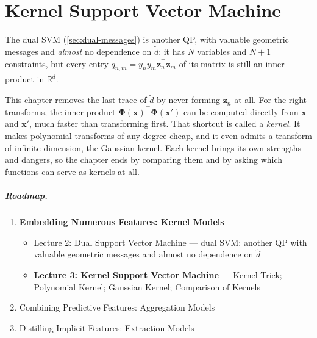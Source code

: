 \chapter{Kernel Support Vector Machine}

\begin{prev}
    The dual SVM (\autoref{sec:dual-messages}) is another QP, with valuable
    geometric messages and \emph{almost} no dependence on \(\tilde{d}\): it
    has \(N\) variables and \(N + 1\) constraints, but every entry \(q_{n,m} =
    y_n y_m \bm{z}_n^\top \bm{z}_m\) of its matrix is still an inner product
    in \(\mathbb{R}^{\tilde{d}}\).
\end{prev}

This chapter removes the last trace of \(\tilde{d}\) by never forming
\(\bm{z}_n\) at all. For the right transforms, the inner product
\(\bm{\Phi}(\bm{x})^\top \bm{\Phi}(\bm{x}')\) can be computed directly from
\(\bm{x}\) and \(\bm{x}'\), much faster than transforming first. That
shortcut is called a \emph{kernel}. It makes polynomial transforms of any
degree cheap, and it even admits a transform of infinite dimension, the
Gaussian kernel. Each kernel brings its own strengths and dangers, so the
chapter ends by comparing them and by asking which functions can serve as
kernels at all.

\paragraph{Roadmap.}
\begin{enumerate}
    \item \textbf{Embedding Numerous Features: Kernel Models}
        \begin{itemize}
            \item[] Lecture 2: Dual Support Vector Machine --- dual SVM:
                another QP with valuable geometric messages and almost no
                dependence on \(\tilde{d}\)
            \item[] \textbf{Lecture 3: Kernel Support Vector Machine} ---
                Kernel Trick; Polynomial Kernel; Gaussian Kernel; Comparison
                of Kernels
        \end{itemize}
    \item Combining Predictive Features: Aggregation Models
    \item Distilling Implicit Features: Extraction Models
\end{enumerate}

